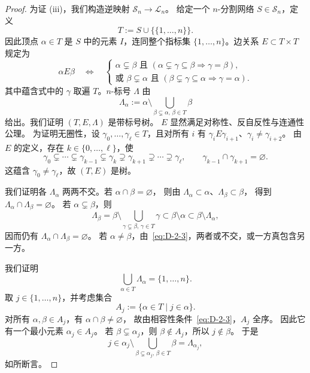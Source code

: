 \begin{proof}
为证 (iii)，我们构造逆映射 $\mathcal S_n\to\mathcal L_n$。
给定一个 $n$-分割网络 $S\in\mathcal S_n$，定义
\begin{equation}\label{eq:D-2-5}
  T:=S\cup\{\{1,\ldots,n\}\}.
\end{equation}
因此顶点 $\alpha\in T$ 是 $S$ 中的元素 $I$，连同整个指标集
$\{1,\ldots,n\}$。边关系 $E\subset T\times T$ 规定为
\begin{equation}\label{eq:D-2-6}
  \alpha E\beta\quad\Longleftrightarrow\quad
  \begin{cases}
    \alpha\subsetneq\beta\text{ 且 }
       (\alpha\subsetneq\gamma\subseteq\beta\Rightarrow\gamma=\beta),\\
    \text{或 }\beta\subsetneq\alpha\text{ 且 }
       (\beta\subsetneq\gamma\subseteq\alpha\Rightarrow\gamma=\alpha).
  \end{cases}
\end{equation}
其中蕴含式中的 $\gamma$ 取遍 $T$。$n$-标号 $\Lambda$ 由
\begin{equation}\label{eq:D-2-7}
  \Lambda_\alpha:=\alpha\setminus
    \bigcup_{\beta\subsetneq\alpha,\,\beta\in T}\beta
\end{equation}
给出。我们证明 $(T,E,\Lambda)$ 是带标号树。
$E$ 显然满足对称性、反自反性与连通性公理。
为证明无圈性，设 $\gamma_0,\ldots,\gamma_\ell\in T$，且对所有 $i$
有 $\gamma_iE\gamma_{i+1}$、$\gamma_i\ne\gamma_{i+2}$。
由 $E$ 的定义，存在 $k\in\{0,\ldots,\ell\}$，使
\[
  \gamma_0\subsetneq\cdots\subsetneq\gamma_{k-1}
  \subsetneq\gamma_k\supsetneq\gamma_{k+1}
  \supsetneq\cdots\supsetneq\gamma_\ell,
  \qquad \gamma_{k-1}\cap\gamma_{k+1}=\varnothing.
\]
这蕴含 $\gamma_0\ne\gamma_\ell$，故 $(T,E)$ 是树。

我们证明各 $\Lambda_\alpha$ 两两不交。若 $\alpha\cap\beta=\varnothing$，
则由 $\Lambda_\alpha\subset\alpha$、$\Lambda_\beta\subset\beta$，
得到 $\Lambda_\alpha\cap\Lambda_\beta=\varnothing$。
若 $\alpha\subsetneq\beta$，则
\[
  \Lambda_\beta=\beta\setminus
  \bigcup_{\gamma\subsetneq\beta,\,\gamma\in T}\gamma
  \subset\beta\setminus\alpha
  \subset\beta\setminus\Lambda_\alpha,
\]
因而仍有 $\Lambda_\alpha\cap\Lambda_\beta=\varnothing$。
若 $\alpha\ne\beta$，由~\eqref{eq:D-2-3}，两者或不交，或一方真包含另一方。

我们证明
\[
  \bigcup_{\alpha\in T}\Lambda_\alpha=\{1,\ldots,n\}.
\]
取 $j\in\{1,\ldots,n\}$，并考虑集合
\[
  A_j:=\{\alpha\in T\mid j\in\alpha\}.
\]
对所有 $\alpha,\beta\in A_j$，有 $\alpha\cap\beta\ne\varnothing$，
故由相容性条件~\eqref{eq:D-2-3}，$A_j$ 全序。
因此它有一个最小元素 $\alpha_j\in A_j$。
若 $\beta\subsetneq\alpha_j$，则 $\beta\notin A_j$，所以 $j\notin\beta$。
于是
\[
  j\in\alpha_j\setminus
  \bigcup_{\beta\subsetneq\alpha_j,\,\beta\in T}\beta
  =\Lambda_{\alpha_j},
\]
如所断言。


\end{proof}
